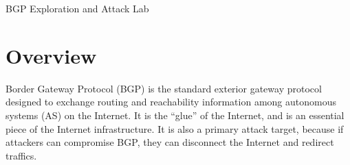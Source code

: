 
\newcommand{\commonfolder}{../../common-files}





\newcommand{\bgpFigs}{./Figs}

\newcommand{\bgpintro}{1\xspace}
\newcommand{\bgpprotocol}{3\xspace}
\newcommand{\bgppeering}{6\xspace}
\newcommand{\bgpupdate}{7\xspace}
\newcommand{\pathselection}{8\xspace}
\newcommand{\bigcommunity}{9\xspace}
\newcommand{\transitas}{10\xspace}
\newcommand{\ipanycast}{11\xspace}
\newcommand{\bgphijacking}{12\xspace}




\usepackage{hyperref}




\begin{center}
{\LARGE BGP Exploration and Attack Lab}
\end{center}






\section{Overview}

Border Gateway Protocol (BGP) is the standard exterior gateway protocol
designed to exchange routing and reachability information among autonomous
systems (AS) on the Internet. It is the ``glue'' of the Internet,
and is an essential piece of the Internet infrastructure. It is 
also a primary attack target, because if attackers can 
compromise BGP, they can disconnect the Internet and redirect traffics. 

